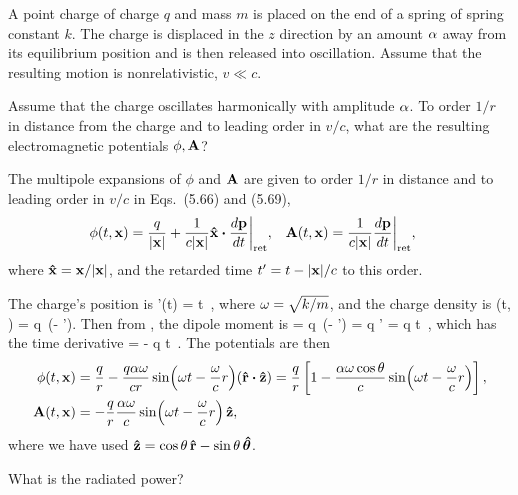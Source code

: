 \begin{statement}{}
	A point charge of charge $q$ and mass $m$ is placed on the end of a spring of spring constant $k$.  The charge is displaced in the $z$ direction by an amount $\alpha$ away from its equilibrium position and is then released into oscillation.  Assume that the resulting motion is nonrelativistic, $v \ll c$.
\end{statement}

\begin{problem}
	Assume that the charge oscillates harmonically with amplitude $\alpha$.  To order $1 / r$ in distance from the charge and to leading order in $v / c$, what are the resulting electromagnetic potentials $\phi, \vb{A}$?
\end{problem}

\begin{solution}
	The multipole expansions of $\phi$ and $\vb{A}$ are given to order $1 / r$ in distance and to leading order in $v / c$ in Eqs.~(5.66) and (5.69),
	\begin{align*}
		\phi(t, \vx) &= \frac{q}{\absx} + \frac{1}{c \absx} \xh \vdot \dv{\vp}{t} \bigg|_\ret, &
		\vA(t, \vx) &= \frac{1}{c \absx} \dv{\vp}{t} \bigg|_\ret,
	\end{align*}
	where $\vb{\hat{x}} = \vb{x} / \abs{\vb{x}}$, and the retarded time $t' = t - \abs{\vb{x}} / c$ to this order.

	The charge's position is
	\beq
		\vx'(t) = \alp \cos \omg t \,\zh,
	\eeq
	where $\omega = \sqrt{k / m}$, and the charge density is
	\beq
		\rho(t, \vx) = q \,\del(\vx - \vx').
	\eeq
	Then from , the dipole moment is
	\beq
		\vp = q \int \vx \,\del(\vx - \vx') \dcx
		= q \vx'
		= q \alp \cos \omg t \,\zh,
	\eeq
	which has the time derivative
	\beqn \label{pder}
		 = - q \alp \omg \sin \omg t \,\zh.
	\eeqn
	The potentials are then
	\begin{align*}
		\phi(t, \vx) &= \frac{q}{r} - \frac{q \alp \omg }{c r} \sin(\omg t - \frac{\omg}{c} r) (\rh \vdot \zh)
		= \frac{q}{r} \left[ 1 - \frac{\alp \omg \cos\tht}{c} \sin(\omg t - \frac{\omg}{c} r) \right], \\
		\vA(t, \vx) &= -\frac{q}{r} \frac{\alp \omg }{c} \sin(\omg t - \frac{\omg}{c} r) \,\zh,
	\end{align*}
	where we have used $\vb{\hat{z}} = \cos\theta \,\vb{\hat{r}} - \sin\theta \,\boldsymbol{\hat{\theta}}$.
\end{solution}



\begin{problem}
	What is the radiated power?
\end{problem}


